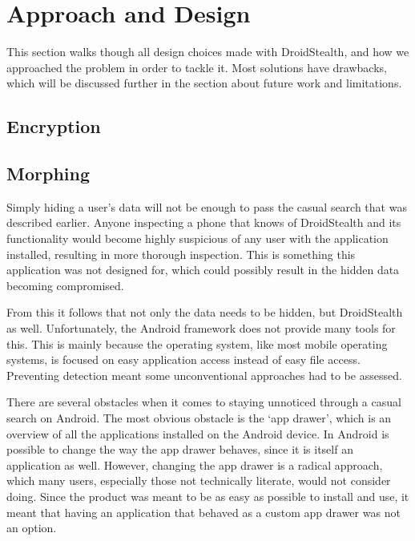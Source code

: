 \section{Approach and Design}
\label{sec:approach-and-design}
This section walks though all design choices made with DroidStealth,
and how we approached the problem in order to tackle it. Most 
solutions have drawbacks, which will be discussed further in the
section about future work and limitations. %


\subsection{Encryption}
\label{sec:approach-and-design:encryption}

\subsection{Morphing}
\label{sec:approach-and-design:morphing}

Simply hiding a user's data will not be enough to pass the casual search that was described earlier. 
Anyone inspecting a phone that knows of DroidStealth and its functionality would become highly suspicious of any user with the application installed, resulting in more thorough inspection. 
This is something this application was not designed for, which could possibly result in the hidden data becoming compromised. 

From this it follows that not only the data needs to be hidden, but DroidStealth as well. 
Unfortunately, the Android framework does not provide many tools for this. 
This is mainly because the operating system, like most mobile operating systems, is focused on easy application access instead of easy file access. 
Preventing detection meant some unconventional approaches had to be assessed.

There are several obstacles when it comes to staying unnoticed through a casual search on Android. 
The most obvious obstacle is the `app drawer', which is an overview of all the applications installed on the Android device.
In Android is possible to change the way the app drawer behaves, since it is itself an application as well.
However, changing the app drawer is a radical approach, which many users, especially those not technically literate, would not consider doing.
Since the product was meant to be as easy as possible to install and use, it meant that having an application that behaved as a custom app drawer was not an option.

